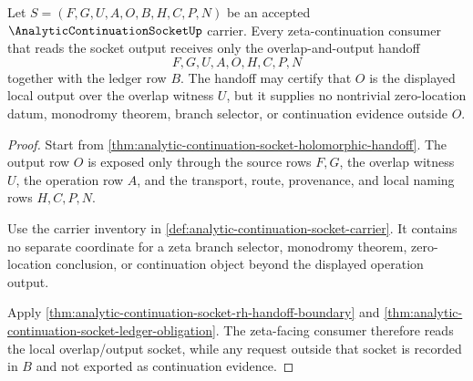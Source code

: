 \begin{theorem}
\label{thm:analytic-continuation-socket-overlap-to-zeta-handoff}
Let $S=(F,G,U,A,O,B,H,C,P,N)$ be an accepted $\AnalyticContinuationSocketUp$ carrier. Every zeta-continuation consumer that reads the socket output receives only the overlap-and-output handoff
$$
F,G,U,A,O,H,C,P,N
$$
together with the ledger row $B$. The handoff may certify that $O$ is the displayed local output over the overlap witness $U$, but it supplies no nontrivial zero-location datum, monodromy theorem, branch selector, or continuation evidence outside $O$.
\end{theorem}
\begin{proof}
Start from \autoref{thm:analytic-continuation-socket-holomorphic-handoff}. The output row $O$ is exposed only through the source rows $F,G$, the overlap witness $U$, the operation row $A$, and the transport, route, provenance, and local naming rows $H,C,P,N$.

Use the carrier inventory in \autoref{def:analytic-continuation-socket-carrier}. It contains no separate coordinate for a zeta branch selector, monodromy theorem, zero-location conclusion, or continuation object beyond the displayed operation output.

Apply \autoref{thm:analytic-continuation-socket-rh-handoff-boundary} and \autoref{thm:analytic-continuation-socket-ledger-obligation}. The zeta-facing consumer therefore reads the local overlap/output socket, while any request outside that socket is recorded in $B$ and not exported as continuation evidence.
\end{proof}

